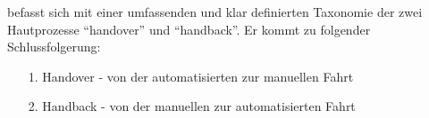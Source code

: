 \cite{wintersberger} befasst sich mit einer umfassenden und klar definierten Taxonomie der zwei Hautprozesse ``handover'' und ``handback''. Er kommt zu folgender Schlussfolgerung:

\begin{itemize}
	\item[1.] Handover - von der automatisierten zur manuellen Fahrt			  
	\item[2.] Handback - von der manuellen zur automatisierten Fahrt			  
\end{itemize}
